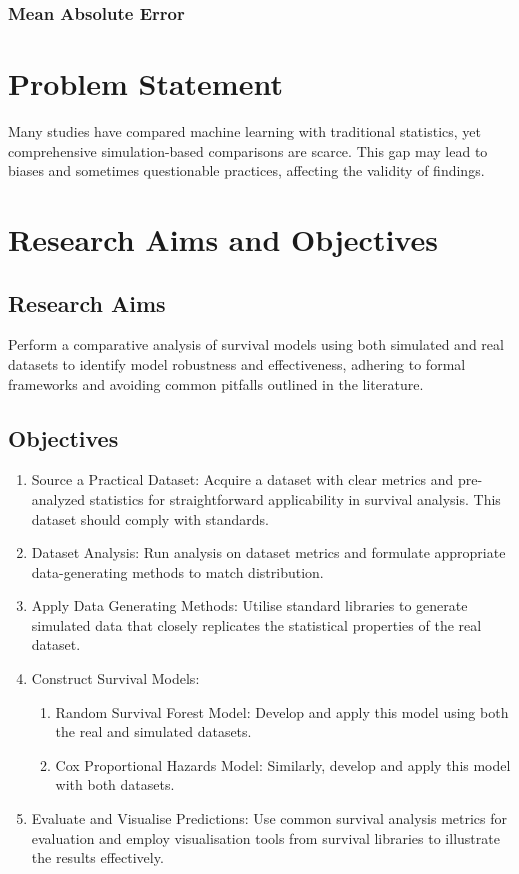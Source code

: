 \subsubsection{Mean Absolute Error}


\section{Problem Statement}

\noindent 
Many studies have compared machine learning with traditional statistics, yet comprehensive simulation-based comparisons are scarce. This gap may lead to biases and sometimes questionable practices, affecting the validity of findings.

\section{Research Aims and Objectives}

\subsection{Research Aims}

\noindent 
Perform a comparative analysis of survival models using both simulated and real datasets to identify model robustness and effectiveness, adhering to formal frameworks and avoiding common pitfalls outlined in the literature.

\subsection{Objectives}

\begin{enumerate}
	\item Source a Practical Dataset: Acquire a dataset with clear metrics and pre-analyzed statistics for straightforward applicability in survival analysis. This dataset should comply with standards. 
	\item Dataset Analysis: Run analysis on dataset metrics and formulate appropriate data-generating methods to match distribution.
	\item Apply Data Generating Methods: Utilise standard libraries to generate simulated data that closely replicates the statistical properties of the real dataset.
	\item Construct Survival Models:
	\begin{enumerate}
		\item Random Survival Forest Model: Develop and apply this model using both the real and simulated datasets.
		\item Cox Proportional Hazards Model: Similarly, develop and apply this model with both datasets.
	\end{enumerate}
	\item Evaluate and Visualise Predictions: Use common survival analysis metrics for evaluation and employ visualisation tools from survival libraries to illustrate the results effectively.
\end{enumerate}
 
